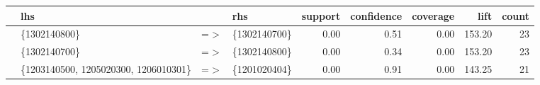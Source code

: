 \begin{table}[ht]
\centering
\begin{tabular}{rlllrrrrr}
  \hline
 & lhs &  & rhs & support & confidence & coverage & lift & count \\ 
  \hline
[1] & \{1302140800\} & =$>$ & \{1302140700\} & 0.00 & 0.51 & 0.00 & 153.20 &  23 \\ 
  [2] & \{1302140700\} & =$>$ & \{1302140800\} & 0.00 & 0.34 & 0.00 & 153.20 &  23 \\ 
  [3] & \{1203140500, 1205020300, 1206010301\} & =$>$ & \{1201020404\} & 0.00 & 0.91 & 0.00 & 143.25 &  21 \\ 
   \hline
\end{tabular}
\end{table}
